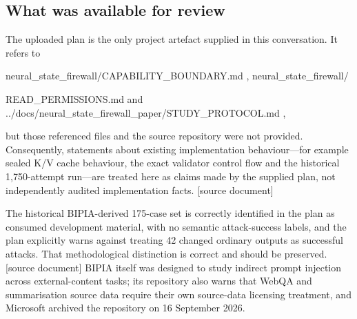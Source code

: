 \documentclass[11pt,a4paper]{article}
\begin{document}
\subsection*{What was available for review}
The uploaded plan is the only project artefact supplied in this conversation. It refers to\par
neural\_state\_firewall/CAPABILITY\_BOUNDARY.md , neural\_state\_firewall/\par
READ\_PERMISSIONS.md  and ../docs/neural\_state\_firewall\_paper/STUDY\_PROTOCOL.md ,\par
but those referenced files and the source repository were not provided. Consequently, statements about existing implementation behaviour—for example sealed K/V cache behaviour, the exact validator control flow and the historical 1,750-attempt run—are treated here as claims made by the supplied plan, not independently audited implementation facts. [source document]\par
The historical BIPIA-derived 175-case set is correctly identified in the plan as consumed development material, with no semantic attack-success labels, and the plan explicitly warns against treating 42 changed ordinary outputs as successful attacks. That methodological distinction is correct and should be preserved. [source document] BIPIA itself was designed to study indirect prompt injection across external-content tasks; its repository also warns that WebQA and summarisation source data require their own source-data licensing treatment, and Microsoft archived the repository on 16 September 2026.\par
\end{document}
